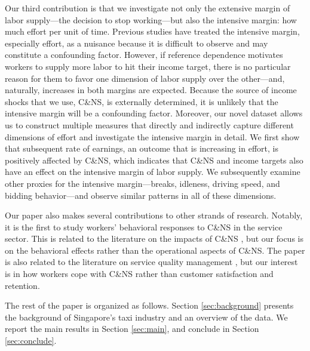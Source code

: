 \documentclass[reviewmode,AEJ]{AEA}
\begin{document}
Our third contribution is that we investigate not only the extensive margin of labor supply---the decision
to stop working---but also the intensive margin: %
how much effort per unit of time. 
Previous studies have treated the intensive margin, especially effort, as a nuisance because it is 
difficult to observe and may constitute a confounding factor. However, if reference dependence motivates
workers to supply more labor to hit their income target, there is no particular reason for them to favor
one dimension of labor supply over the other---and, naturally, increases in both margins are expected.
Because the source of income shocks that we use, C\&NS, is externally determined, it is unlikely that the 
intensive margin will be a confounding factor. Moreover, our novel dataset allows us to construct multiple
measures that directly and indirectly capture different dimensions of effort and investigate the intensive
margin in detail. We first show that subsequent rate of earnings, an outcome that is increasing in effort,
is positively affected by C\&NS, which indicates that C\&NS and income targets also have an effect on the
intensive margin of labor supply. We subsequently examine other proxies for the intensive margin---breaks,
idleness, driving speed, and bidding behavior---and observe similar patterns in all of these dimensions.

Our paper also makes several contributions to other strands of research. Notably, it is the first to study
workers' behavioral responses to C\&NS in the service sector. This is related to the literature on the
impacts of C\&NS \citep{moore2001time,patrick2008reducing,norris2014empirical,feldman2014appointment}, 
but our focus is on the behavioral effects rather than the operational aspects of C\&NS. 
The paper is also related to the literature on service quality management \citep{cohen2018frustration},
but our interest is in how workers cope with C\&NS rather than customer satisfaction and retention. 

The rest of the paper is organized as follows. 
Section \ref{sec:background} presents the background of Singapore's taxi industry and an overview of the data. 
We %
report the main results in Section \ref{sec:main}, and conclude in Section \ref{sec:conclude}.

\end{document}
